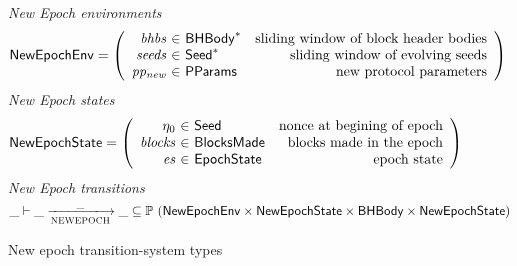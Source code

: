 \begin{figure}[ht]
  \emph{New Epoch environments}
  \begin{equation*}
    \NewEpochEnv =
    \left(
      \begin{array}{r@{~\in~}lr}
        \var{bhbs} & \seqof{\BHBody} & \text{sliding window of block header bodies} \\
        \var{seeds} & \seqof{\Seed} & \text{sliding window of evolving seeds} \\
        \var{pp_{new}} & \PParams & \text{new protocol parameters}\\
      \end{array}
    \right)
  \end{equation*}
  \emph{New Epoch states}
  \begin{equation*}
    \NewEpochState =
    \left(
      \begin{array}{r@{~\in~}lr}
        \eta_0 & \Seed & \text{nonce at begining of epoch} \\
        \var{blocks} & \BlocksMade & \text{blocks made in the epoch}\\
        \var{es} & \EpochState & \text{epoch state} \\
      \end{array}
    \right)
  \end{equation*}
  \emph{New Epoch transitions}
  \begin{equation*}
    \_ \vdash \var{\_} \trans{NEWEPOCH}{\_} \var{\_} \subseteq
    \powerset (\NewEpochEnv \times \NewEpochState \times \BHBody \times \NewEpochState)
  \end{equation*}
  \caption{New epoch transition-system types}
  \label{fig:ts-types:new-epoch}
\end{figure}

